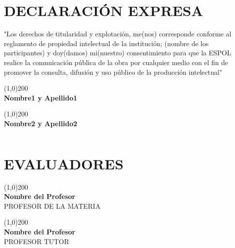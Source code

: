 \chapter*{DECLARACI\'ON EXPRESA}
\thispagestyle{empty}
"Los derechos de titularidad y explotaci\'on, me(nos) corresponde conforme al reglamento de propiedad intelectual de la instituci\'on; (nombre de los participantes) y doy(damos) mi(nuestro) consentimiento para que la ESPOL realice la comunicaci\'on p\'ublica de la obra por cualquier medio con el fin de promover la consulta, difusi\'on y uso p\'ublico de la producci\'on intelectual"
\\[7.5em]
\begin{minipage}{.45\linewidth}
    \begin{flushleft} 
        \line(1,0){200} \\ \centering \textbf{Nombre1 y Apellido1}
    \end{flushleft}
  \end{minipage}
  \hfill
  \begin{minipage}{.45\linewidth}
    \begin{flushright}
        \line(1,0){200} \\ \centering \textbf{Nombre2 y Apellido2}
    \end{flushright} 
  \end{minipage}

\newpage
$\ $
\thispagestyle{empty}


\chapter*{EVALUADORES}
\thispagestyle{empty}
\vspace{15.0em}
\begin{minipage}{.45\linewidth}
    \begin{flushleft} 
        \line(1,0){200} \\ \centering \textbf{Nombre del Profesor} \\ PROFESOR DE LA MATERIA 
    \end{flushleft}
  \end{minipage}
  \hfill
  \begin{minipage}{.45\linewidth}
    \begin{flushright}
        \line(1,0){200} \\ \centering \textbf{Nombre del Profesor} \\ PROFESOR TUTOR
    \end{flushright} 
  \end{minipage}

\newpage
$\ $
\thispagestyle{empty}